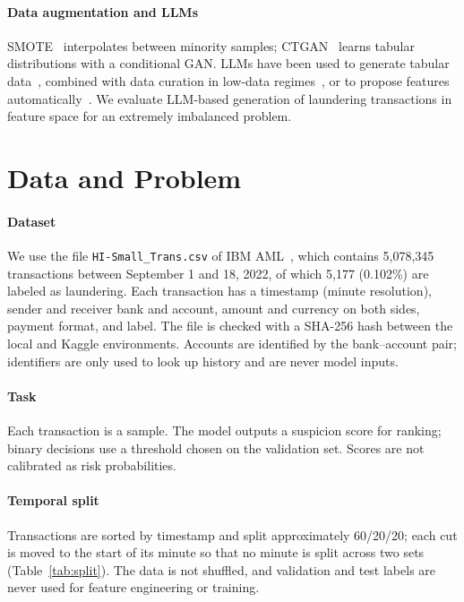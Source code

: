 \documentclass[sigconf,nonacm]{acmart}
\begin{document}
\paragraph{Data augmentation and LLMs} SMOTE~\cite{chawla2002smote} interpolates between minority samples;
CTGAN~\cite{xu2019ctgan} learns tabular distributions with a conditional GAN. LLMs have been used to generate tabular
data~\cite{borisov2023great}, combined with data curation in low-data regimes~\cite{seedat2024cllm}, or to propose
features automatically~\cite{hollmann2023caafe,abhyankar2025llmfe}. We evaluate LLM-based generation of laundering
transactions in feature space for an extremely imbalanced problem.

\section{Data and Problem}

\paragraph{Dataset} We use the file \texttt{HI-Small\_Trans.csv} of IBM AML~\cite{ibmamlkaggle}, which contains
5,078,345 transactions between September 1 and 18, 2022, of which 5,177 (0.102\%) are labeled as laundering. Each
transaction has a timestamp (minute resolution), sender and receiver bank and account, amount and currency on both
sides, payment format, and label. The file is checked with a SHA-256 hash between the local and Kaggle environments.
Accounts are identified by the bank--account pair; identifiers are only used to look up history and are never model
inputs.

\paragraph{Task} Each transaction is a sample. The model outputs a suspicion score for ranking; binary decisions use
a threshold chosen on the validation set. Scores are not calibrated as risk probabilities.

\paragraph{Temporal split} Transactions are sorted by timestamp and split approximately 60/20/20; each cut is moved to
the start of its minute so that no minute is split across two sets (Table~\ref{tab:split}). The data is not shuffled,
and validation and test labels are never used for feature engineering or training.
\end{document}
